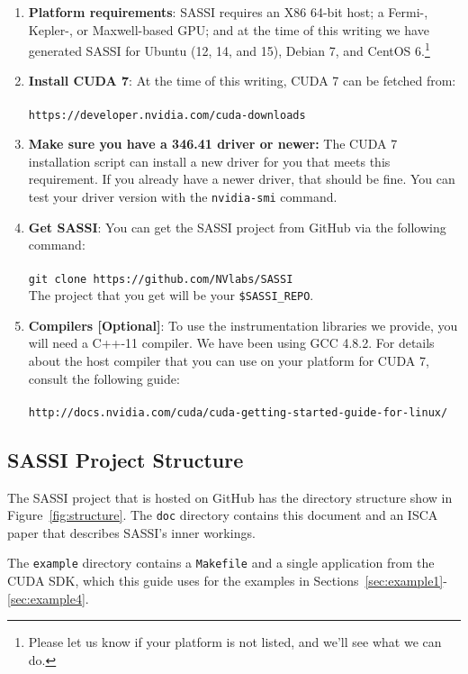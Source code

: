 \begin{enumerate}
\item {\bf Platform requirements}: SASSI requires an X86 64-bit host;
  a Fermi-, Kepler-, or Maxwell-based GPU; and at the time of this
  writing we have generated SASSI for Ubuntu (12, 14, and 15), Debian
  7, and CentOS 6.\footnote{Please let us know if your platform
    is not listed, and we'll see what we can do.}
\item {\bf Install CUDA 7}: At the time of this writing, CUDA 7 can
  be fetched
  from:\\ \\  \texttt{https://developer.nvidia.com/cuda-downloads} \\
\item {\bf Make sure you have a 346.41 driver or newer:} The CUDA 7
  installation script can install a new driver for you that meets this
  requirement.  If you already have a newer driver, that should be
  fine.  You can test your driver version with the \texttt{nvidia-smi}
  command.
\item {\bf Get SASSI}: You can get the SASSI project from GitHub via the following
  command: \\ \\ \texttt{git clone https://github.com/NVlabs/SASSI} \\

  The project that you get will be your \texttt{\$SASSI\_REPO}.
\item {\bf Compilers [Optional]}: To use the instrumentation libraries
  we provide, you will need a C++-11 compiler.  We have been using GCC
  4.8.2.  For details about the host compiler that you can use on your
  platform for CUDA 7, consult the following
  guide:\\ \\ \texttt{http://docs.nvidia.com/cuda/cuda-getting-started-guide-for-linux/}
\end{enumerate}

\subsection{SASSI Project Structure}

The SASSI project that is hosted on GitHub has the directory structure
show in Figure~\ref{fig:structure}.  The \texttt{doc} directory
contains this document and an ISCA paper that describes SASSI's inner
workings.

The \texttt{example} directory contains a \texttt{Makefile} and a
single application from the CUDA SDK, which this guide uses for the
examples in Sections~\ref{sec:example1}-\ref{sec:example4}.


